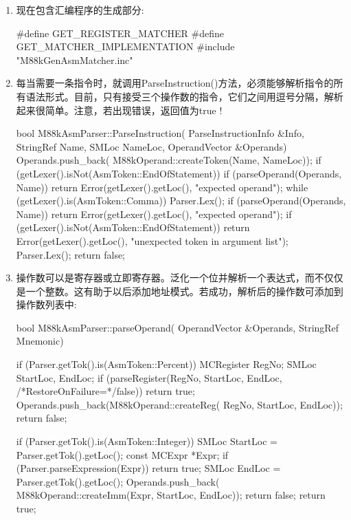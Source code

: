\begin{enumerate}
\item
现在包含汇编程序的生成部分:

\begin{cpp}
#define GET_REGISTER_MATCHER
#define GET_MATCHER_IMPLEMENTATION
#include "M88kGenAsmMatcher.inc"
\end{cpp}

\item
每当需要一条指令时，就调用ParseInstruction()方法，必须能够解析指令的所有语法形式。目前，只有接受三个操作数的指令，它们之间用逗号分隔，解析起来很简单。注意，若出现错误，返回值为true !

\begin{cpp}
bool M88kAsmParser::ParseInstruction(
        ParseInstructionInfo &Info, StringRef Name,
        SMLoc NameLoc, OperandVector &Operands) {
    Operands.push_back(
        M88kOperand::createToken(Name, NameLoc));
    if (getLexer().isNot(AsmToken::EndOfStatement)) {
        if (parseOperand(Operands, Name)) {
            return Error(getLexer().getLoc(),
                         "expected operand");
        }
        while (getLexer().is(AsmToken::Comma)) {
            Parser.Lex();
            if (parseOperand(Operands, Name)) {
                return Error(getLexer().getLoc(),
                "expected operand");
            }
        }
        if (getLexer().isNot(AsmToken::EndOfStatement))
            return Error(getLexer().getLoc(),
                "unexpected token in argument list");
    }
    Parser.Lex();
    return false;
}
\end{cpp}

\item
操作数可以是寄存器或立即寄存器。泛化一个位并解析一个表达式，而不仅仅是一个整数。这有助于以后添加地址模式。若成功，解析后的操作数可添加到操作数列表中:

\begin{cpp}
bool M88kAsmParser::parseOperand(
        OperandVector &Operands, StringRef Mnemonic) {
    if (Parser.getTok().is(AsmToken::Percent)) {
        MCRegister RegNo;
        SMLoc StartLoc, EndLoc;
        if (parseRegister(RegNo, StartLoc, EndLoc,
                        /*RestoreOnFailure=*/false))
            return true;
        Operands.push_back(M88kOperand::createReg(
            RegNo, StartLoc, EndLoc));
        return false;
    }

    if (Parser.getTok().is(AsmToken::Integer)) {
        SMLoc StartLoc = Parser.getTok().getLoc();
        const MCExpr *Expr;
        if (Parser.parseExpression(Expr))
            return true;
        SMLoc EndLoc = Parser.getTok().getLoc();
        Operands.push_back(
            M88kOperand::createImm(Expr, StartLoc, EndLoc));
        return false;
    }
    return true;
}
\end{cpp}


\end{enumerate}

